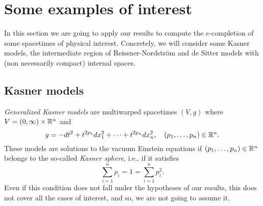 \section{Some examples of interest}%
\label{sec:applications}

In this section we are going to apply our results to compute the c-completion of some spacetimes of physical interest. Concretely, we will consider some Kasner models, the intermediate region of Reissner-Nordstr\"om and de Sitter models with (non necessarily compact) internal spaces.

%
    \subsection*{Kasner models}
{\em Generalized Kasner models} are multiwarped  spacetimes $(V,g)$ where $V=(0,\infty)\times {\mathbb R}^{n}$ and
\begin{equation}
  \label{eq:35}
g=-dt^2+t^{2p_1}dx_1^2+\dots +t^{2p_{n}}dx_{n}^2,\quad\hbox{$(p_1,\ldots,p_n)\in{\mathbb R}^n$}.
\end{equation}
These models are solutions to the vacuum Einstein equations if $(p_1,\dots,p_{n})\in {\mathbb R}^{n}$ belongs to the so-called {\em Kasner sphere}, i.e., if it satisfies
  \[
\sum_{i=1}^{n}p_i=1=\sum_{i=1}^{n}p^2_i.
\]
Even if this condition does not fall under the hypotheses of our results, this does not cover all the cases of interest, and so, we are not going to assume it.

